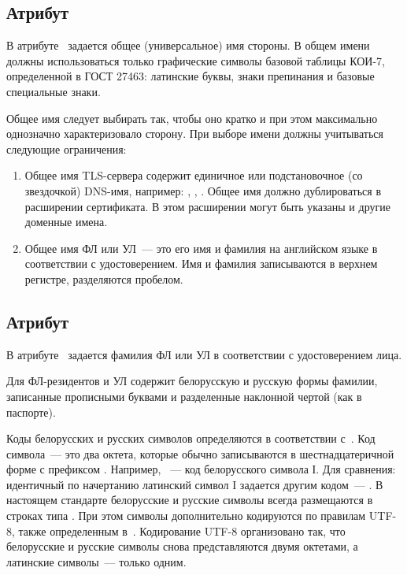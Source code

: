 \subsection{Атрибут }\label{ENTITIES.Id.CN}

В атрибуте~ задается общее (универсальное) имя стороны. В общем
имени должны использоваться только графические символы базовой таблицы КОИ-7,
определенной в ГОСТ 27463: латинские буквы, знаки препинания и базовые
специальные знаки.
 
Общее имя следует выбирать так, чтобы оно кратко и при этом максимально
однозначно характеризовало сторону. При выборе имени должны учитываться
следующие ограничения:

\begin{enumerate}
\item
Общее имя TLS-сервера содержит единичное или подстановочное (со звездочкой)
DNS-имя, например: , , .
%
Общее имя должно дублироваться в расширении  сертификата. В
этом расширении могут быть указаны и другие доменные имена.

\item
Общее имя ФЛ или УЛ~--- это его имя и фамилия на английском языке в 
соответствии с удостоверением.
%
Имя и фамилия записываются в верхнем регистре, разделяются пробелом.
% 
\end{enumerate}

\subsection{Атрибут }\label{ENTITIES.Id.S}

В атрибуте~ задается фамилия ФЛ или УЛ в соответствии с 
удостоверением лица.

Для ФЛ-резидентов и УЛ  содержит белорусскую и русскую 
формы фамилии, записанные прописными буквами и разделенные наклонной чертой 
(как в паспорте).
%

\begin{note*} 
Коды белорусских и русских символов определяются в соответствии с~\cite{UTF8}.
Код символа~--- это два октета, которые обычно записываются в шестнадцатеричной
форме с префиксом . Например, ~--- код белорусского
символа І. Для сравнения: идентичный по начертанию латинский символ I задается
другим кодом~--- .
%
В настоящем стандарте белорусские и русские символы всегда размещаются в строках
типа .
%
При этом символы дополнительно кодируются по правилам UTF-8, также определенным
в~\cite{UTF8}. Кодирование UTF-8 организовано так, что белорусские и русские
символы снова представляются двумя октетами, а латинские символы~--- только
одним.
\end{note*}

